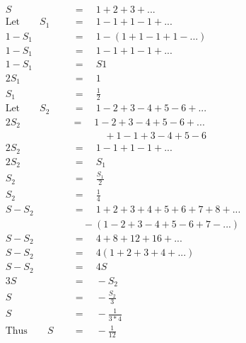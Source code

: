 \begin{align*}
S\quad&\,=\quad1+2+3+...\\
\mathrm{Let}\qquad S_1\quad&\,=\quad1-1+1-1+...\\
1-S_1\quad&\,=\quad1-(1+1-1+1-...)\\
1-S_1\quad&\,=\quad1-1+1-1+...\\
1-S_1\quad&\,=\quad S1\\
2S_1\quad&\,=\quad1\\
S_1\quad&\,=\quad\frac{1}{2}\\
\mathrm{Let}\qquad S_2\quad&\,=\quad1-2+3-4+5-6+...\\
2S_2\quad&=\quad1-2+3-4+5-6+...\\
\quad&\,\qquad\quad\,+1-1+3-4+5-6\\
2S_2\quad&\,=\quad1-1+1-1+...\\
2S_2\quad&\,=\quad S_1\\
S_2\quad&\,=\quad\frac{S_1}{2}\\
S_2\quad&\,=\quad\frac{1}{4}\\
S-S_2\quad&\,=\quad1+2+3+4+5+6+7+8+...\\
\quad&\,\quad-(1-2+3-4+5-6+7-...)\\
S-S_2\quad&\,=\quad4+8+12+16+...\\
S-S_2\quad&\,=\quad4(1+2+3+4+...)\\
S-S_2\quad&\,=\quad4S\\
3S\quad&\,=\quad-S_2\\
S\quad&\,=\quad-\frac{S_2}{3}\\
S\quad&\,=\quad-\frac{1}{3*4}\\
\mathrm{Thus}\qquad S\quad&\,=\quad-\frac{1}{12}
\end{align*}
